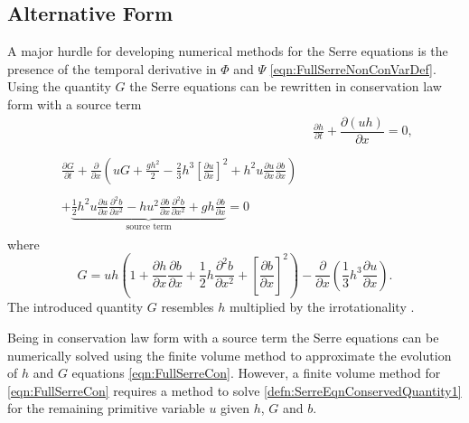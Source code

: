 \subsection{Alternative Form}
A major hurdle for developing numerical methods for the Serre equations is the presence of the temporal derivative in $\Phi$ and $\Psi$ \eqref{eqn:FullSerreNonConVarDef}. Using the quantity $G$ \cite{Hank-etal-2010-2034,Zoppou-2014,Li-2014-169} the Serre equations can be rewritten in conservation law form with a source term
\begin{subequations}
	\label{eqn:FullSerreCon}
	\begin{align}
	& \frac{\partial h}{\partial t} + \dfrac{\partial (uh)}{\partial x} = 0 ,\label{eqn:FullSerreConMass}  \\ \nonumber \\
	\begin{split}
	\label{eqn:Serreconsconmom}
	\frac{\partial G}{\partial t}  + \frac{\partial}{\partial x} \left( {u} G + \frac{gh^2}{2} - \frac{2}{3}h^3 \left[\frac{\partial {u}}{\partial x}\right]^2 + h^2 {u}\frac{\partial {u}}{\partial x}\frac{\partial b}{\partial x} \right) \\ \\ +  \underbrace{\frac{1}{2}h^2 {u} \frac{\partial {u}}{\partial x} \frac{\partial^2 b}{\partial x^2}  - h {u}^2\frac{\partial b}{\partial x}\frac{\partial^2 b}{\partial x^2} + gh\frac{\partial b}{\partial x} } _{\text{source term}} = 0
	\end{split}
	\end{align}
\end{subequations}
where
\begin{equation}
\label{defn:SerreEqnConservedQuantity1}
G =  {u}h \left(1 + \frac{\partial h}{\partial x}\frac{\partial b}{\partial x} + \frac{1}{2}h\frac{\partial^2 b}{\partial x^2} + \left[\frac{\partial b}{\partial x}\right]^2 \right) - \frac{\partial}{\partial x}\left(\frac{1}{3}h^3  \frac{\partial {u}}{\partial x}\right).
\end{equation}
The introduced quantity $G$ resembles $h$ multiplied by the irrotationality \cite{Choi-Camassa-1999-1,Carter-Cienfuegos-2011-259}.

Being in conservation law form with a source term the Serre equations can be numerically solved using the finite volume method to approximate the evolution of $h$ and $G$ equations \eqref{eqn:FullSerreCon}. However, a finite volume method for \eqref{eqn:FullSerreCon} requires a method to solve \eqref{defn:SerreEqnConservedQuantity1} for the remaining primitive variable $u$ given $h$, $G$ and $b$.

